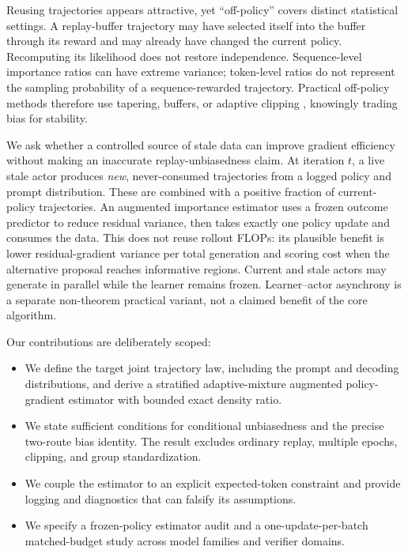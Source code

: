 \documentclass{article}
\begin{document}
Reusing trajectories appears attractive, yet ``off-policy'' covers distinct
statistical settings. A replay-buffer trajectory may have selected itself into
the buffer through its reward and may already have changed the current policy.
Recomputing its likelihood does not restore independence. Sequence-level
importance ratios can have extreme variance; token-level ratios do not
represent the sampling probability of a sequence-rewarded trajectory.
Practical off-policy methods therefore use tapering, buffers, or adaptive
clipping \cite{leroux2025topr,wan2026buffer,xi2026bapo}, knowingly trading bias
for stability.

We ask whether a controlled source of stale data can improve gradient
efficiency without making an inaccurate replay-unbiasedness claim. At iteration
$t$, a live stale actor produces \emph{new}, never-consumed
trajectories from a logged policy and prompt distribution. These are combined
with a positive fraction of current-policy trajectories. An augmented
importance estimator uses a frozen outcome predictor to reduce residual
variance, then takes exactly one policy update and consumes the data.
This does not reuse rollout FLOPs: its plausible benefit is lower
residual-gradient variance per total generation and scoring cost when the
alternative proposal reaches informative regions. Current and stale actors may
generate in parallel while the learner remains frozen. Learner--actor
asynchrony is a separate non-theorem practical variant, not a claimed benefit
of the core algorithm.

Our contributions are deliberately scoped:
\begin{itemize}
  \item We define the target joint trajectory law, including the prompt and
  decoding distributions, and derive a stratified adaptive-mixture augmented
  policy-gradient estimator with bounded exact density ratio.
  \item We state sufficient conditions for conditional unbiasedness and the
  precise two-route bias identity. The result excludes ordinary replay,
  multiple epochs, clipping, and group standardization.
  \item We couple the estimator to an explicit expected-token constraint and
  provide logging and diagnostics that can falsify its assumptions.
  \item We specify a frozen-policy estimator audit and a one-update-per-batch
  matched-budget study across model families and verifier domains.
\end{itemize}
\end{document}
